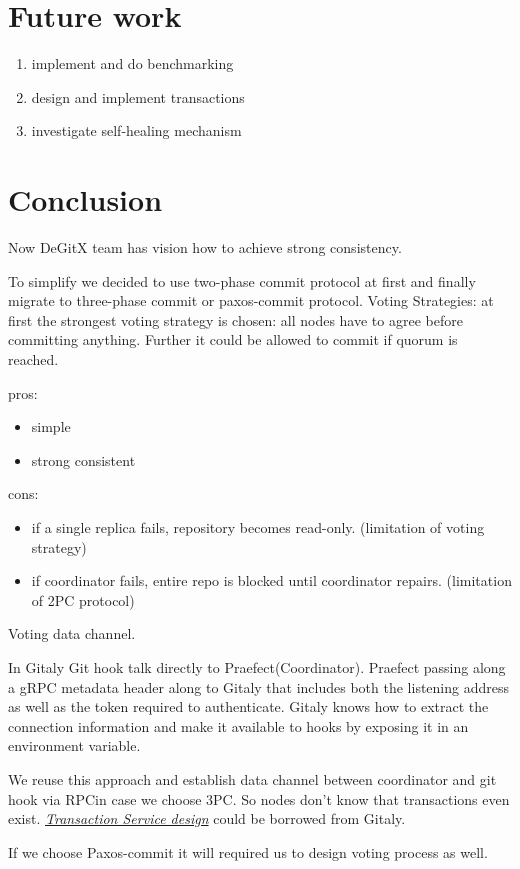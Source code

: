 \documentclass[acmlarge, screen, nonacm]{acmart}
\begin{document}
\section{Future work}

\begin{enumerate}
  \item implement and do benchmarking
  \item design and implement transactions
  \item investigate self-healing mechanism
\end{enumerate}

\section{Conclusion}

Now DeGitX team has vision how to achieve strong consistency.

To simplify we decided to use two-phase commit protocol at first and finally migrate to three-phase commit or paxos-commit protocol.
Voting Strategies: at first the strongest voting strategy is chosen:
all nodes have to agree before committing anything.
Further it could be allowed to commit if quorum is reached.

pros:
\begin{itemize}
  \item simple
  \item strong consistent
\end{itemize}

cons:
\begin{itemize}
  \item if a single replica fails, repository becomes read-only. (limitation of voting strategy)
  \item if coordinator fails, entire repo is blocked until coordinator repairs. (limitation of 2PC protocol)
\end{itemize}

Voting data channel.

In Gitaly Git hook talk directly to Praefect(Coordinator).
Praefect passing along a gRPC metadata header along
to Gitaly that includes both the listening address as well as the token required to authenticate.
Gitaly knows how to extract the connection information and make it available to hooks by exposing it in an environment variable.

We reuse this approach and establish data channel between coordinator and git hook via RPC\@ in case we choose 3PC.
So nodes don't know that transactions even exist.
\emph{\href{https://gitlab.com/gitlab-org/gitaly/-/blob/master/doc/design_ha.md\#transaction-service}{Transaction Service design}}
could be borrowed from Gitaly.

If we choose Paxos-commit it will required us to design voting process as well.
\end{document}
